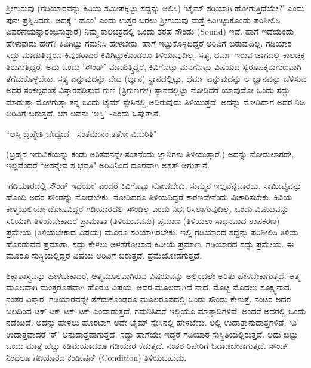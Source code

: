 ಶ್ರೀಗುರುವು (ಗಡಿಯಾರವನ್ನು ಕಿವಿಯ ಸಮೀಪಕ್ಕಿಟ್ಟು ಸದ್ದನ್ನು  ಆಲಿಸಿ) `ಟೈಮ್ ಸರಿಯಾಗಿ ಹೋಗುತ್ತಿದೆಯೇ?' ಎಂದು ಪುನಃ ಪ್ರಶ್ನಿಸಿದರು. ಅದಕ್ಕೆ  ` ಹೂಂ' ಎಂದು ಉತ್ತರ ಬರಲು ಶ್ರೀಗುರುವು ಮತ್ತೆ ಕಿವಿಗಿಟ್ಟುಕೊಂಡು ಪರಿಶೀಲಿಸಿ ವಿವರಣೆಯನ್ನಾರಂಭಿಸುತ್ತಾರೆ) ನಿಮ್ಮ ಕಾಲಚಕ್ರದಲ್ಲಿ ಒಂದು ತರಹ ಸೌಂಡು (Sound) ಇದೆ. ಹಾಗೆ ಇದೆಯೆಂದು ಹೇಳುವುದು ಹೇಗೆ? ಕಿವಿಗಿಟ್ಟು ಗಮನಿಸಿ ಹೇಳಬೇಕು. ಹಾಗೆ ಇಟ್ಟುಕೊಳ್ಳದಿದ್ದರೆ ಅರಿವಿಗೆ ಬರುವುದಿಲ್ಲ. ಗಡಿಯಾರ ಸದ್ದು ಮಾಡುತ್ತಿದ್ದರೂ ಕಿವುಡರಾದರೆ ಕಿವಿಗಿಟ್ಟುಕೊಂಡರೂ ತಿಳಿಯುವುದಿಲ್ಲ. ಸತ್ಯ, ಧರ್ಮ ಇರುವ ಜಾಗದಲ್ಲಿ ಕಾಲಚಕ್ರ ತಿರುಗುತ್ತಿದ್ದರೆ, ಅದು ಒಂದು `ಸೌಂಡ್' ಮಾಡುತ್ತ್ತಿದ್ದರೆ, ಕಿವಿಗೊಟ್ಟು ಮನಗೊಟ್ಟು ವಿಷಯದ ಸ್ವರೂಪಕ್ಕನುಗುಣವಾಗಿ ತೆಗೆದುಕೊಳ್ಳಬೇಕು. ಸತ್ಯ ಎನ್ನುವುದನ್ನು ವೇದ (ಜ್ಞಾನ) ಸ್ಥಾನದಲ್ಲಿಟ್ಟು, ಧರ್ಮ ಎನ್ನುವುದನ್ನು ಆ ಜ್ಞಾನವನ್ನು ಬೆಳಿಸುವ ಅದರ ಸಂಕಲ್ಪದಂತೆ ವಿಸ್ತಾರಪಡಿಸುವ ಗುಣ (ತ್ರಿಗುಣಗಳ) ಸ್ಥಾನದಲ್ಲಿಟ್ಟು ನೋಡಿದರೆ ಯಾವುದೋ ಒಂದು ಸದ್ದು ಮಾಡುತ್ತಾ ಮೊಳಗುತ್ತಾ ತನ್ನ ಒಂದು ಟೈಮ್-ಸ್ಪೇಸಿನಲ್ಲಿ ಅದಿರುವುದು ತಿಳಿಯುತ್ತದೆ. ಅದನ್ನು ನೋಡಿದಾಗ ಅದರ ನಿಜ ಅರಿವಿಗೆ ಬರುತ್ತದೆ. ಆಗ ಅವನು `ಅಸ್ತಿ' -ಎಂದು ಒಪ್ಪುತ್ತಾನೆ.

\begin{shloka}
``ಅಸ್ತಿ ಬ್ರಹ್ಮೇತಿ ಚೇದ್ವೇದ | ಸಂತಮೇನಂ ತತೋ ವಿದುರಿತಿ"
\end{shloka}

(ಬ್ರಹ್ಮನ ಇರುವಿಕೆಯನ್ನು ಕಂಡು ಅರಿತವನನ್ನೇ ಸಂತನೆಂದು ಜ್ಞಾನಿಗಳು ತಿಳಿಯುತ್ತಾರೆ.) ಅದನ್ನು ನೋಡುಲಾಗದೇ, ಇಲ್ಲವೆಂದರೆ ``ಅಸನ್ನೇವ ಸ ಭವತಿ" ಅರಿವಿನಿಂದ ದೂರವಾಗಿ ಅಸತ್ ಆಗುತ್ತಾನೆ.

`ಗಡಿಯಾರದಲ್ಲಿ ಸೌಂಡ್ ಇದೆಯೇ' ಎಂದರೆ ಕಿವಿಗೊಟ್ಟು ನೋಡಬೇಕು, ಸುಮ್ಮನೆ ಇಲ್ಲವೆನ್ನಬಾರದು. ಸಾಮೀಪ್ಯವನ್ನು ಹೊಂದಿ ಅದರ ಸೌಂಡನ್ನು ನೋಡಬೇಕು. ನೋಡಿದರೂ ತಿಳಿಯದಿದ್ದರೆ ಕಾರಣವೇನೆಂದು ವಿಚಾರಿಸಬೇಕು. ಕಿವಿಯ ಕೇಳ್ಮೆಯಲ್ಲಿಯೇ ದೋಷವಿದ್ದರೆ ಗಡಿಯಾರದಲ್ಲಿ ಸೌಂಡಿಲ್ಲ ಎಂದು ನಿರ್ಧರಿಸಲಾಗುವುದಿಲ್ಲ. ಒಂದು ವಿಷಯವನ್ನು ಸರಿಯಾಗಿ ತಿಳಿಯಬೇಕಾದರೆ ಪ್ರಾಮಾತಾ (ತಿಳಿಯುವವನು) ಪ್ರಮಾಣ (ತಿಳಿಯಲು ಸಾಧನವಾದ ಉಪಕರಣ) ಪ್ರಮೇಯ (ತಿಳಿಯಬೇಕಾದ ವಿಷಯ) ಮೂರೂ ಸರಿಯಾಗಿರಬೇಕು. ಇಲ್ಲಿ ಗಡಿಯಾರದ ಸದ್ದನ್ನು ಪರಿಶೀಲಿಸಿ ತಿಳಿಯ ಹೊರಡುವವ ಪ್ರಮಾತಾ. ಸದ್ದು ಕೇಳಲು ಅಳತೆಗೋಲಾದ ಕಿವೀಯೆ ಪ್ರಮಾಣ. ಗಡಿಯಾರದ ಸದ್ದು ಪ್ರಮೇಯ. ಈ ಮೂರೂ ಸುಸ್ಥಿಯಲ್ಲಿದ್ದರೆ ವಿಷಯ ಅರಿವಿಗೆ ಬರುತ್ತದೆ. ಪ್ರಮೆಯೋದಗುತ್ತದೆ.

ಶಿಕ್ಷಾಶಾಸ್ತ್ರವನ್ನು ಹೇಳಬೇಕಾದರೆ, ಆತ್ಮಮೂಲವಾಗಿರುವ ವಿಷಯವನ್ನು ಅಲ್ಲಿಂದಲೇ ಅರಿತು ಹೇಳಬೇಕಾಗುತ್ತದೆ. ಆತ್ಮ ಮೂಲವಾಗಿ ಮಂತ್ರರೂಪವಾಗಿ ಹೊರಟ ವಿಷಯ. ಅದರ ಮೂಲವಾಗಿದೆ ನಾದ. ಮೊಟ್ಟ ಮೊದಲು ಸೂಕ್ಷ್ಮನಾದ. ನಂತರ ವಿಸ್ತಾರ. ಗಡಿಯಾರವನ್ನೇ ತೆಗೆದುಕೊಂಡರೂ ಮೂಲರೂಪದಲ್ಲಿ ಒಂಡು ಸೌಂಡು ಕೇಳುತ್ತೆ. ನಂಟರ ಅದರ ಬಲದಿಂದ ಟಕ್-ಟಕ್-ಟಕ್-ಟಕ್ ಎಂದಾಡುತ್ತದೆ. ಗಮನಿಸಿದರೆ ಇಲ್ಲಿಯೂ ಮಾತ್ರಾದಿಗಳಿವೆ. ಅಂದರೆ ಅದರಲ್ಲಿ ಒಂದು ನಡೆಯಿದೆ. ಅದನ್ನು  ಹೇಳಲು ಹೊರಟಾಗ ಅದೇ ಟೈಮ್ ಸ್ಪೇಸಿನಲ್ಲಿ ಹೇಳಬೇಕು. ಅಲ್ಲಿ ಉದಾತ್ತಾನುದಾತ್ತಗಳಿವೆ. `ಟ' ಉದಾತ್ತವಾದರೆ `ಕ್' ಅನುದಾತ್ತವಾಗುತ್ತದೆ. ಸದ್ದು ಹಾಗೆಯೇ ಇದ್ದರೆ ಗಡಿಯಾರ ಸುಸ್ಥಿತಿಯಲ್ಲಿರುತ್ತದೆ. ಅದು ಬಿಟ್ಟು ಒಂದು ಮಾತ್ರೆ ಹೆಚ್ಚು ಕಡಿಮೆಯಾದರೂ ಗಡಿಯಾರ ಕೆಡುತ್ತದೆ. ನಂತರ ರಿಪೇರಿಗೆ ಓಡಾಡಬೇಕಾಗುತ್ತದೆ. ಸೌಂಡ್ ನಿಂದಲೂ ಗಡಿಯಾರದ ಕಂಡೀಷನ್ (Condition) ತಿಳಿಯಬಹುದು.

